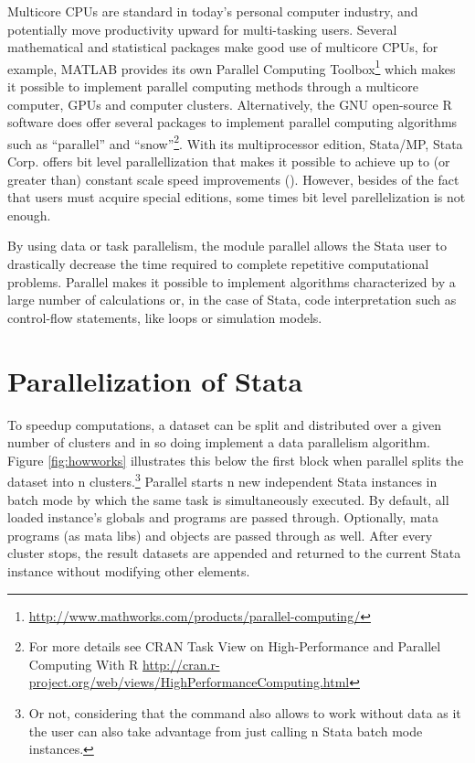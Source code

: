 \documentclass[bib]{statapress}
\begin{document}
Multicore CPUs are standard in today’s personal computer industry, and potentially move productivity upward for multi-tasking users. Several mathematical and statistical packages make good use of multicore CPUs, for example, MATLAB provides its own Parallel Computing Toolbox\footnote{\url{http://www.mathworks.com/products/parallel-computing/}} which makes it possible to implement parallel computing methods through a multicore computer, GPUs and computer clusters. Alternatively, the GNU open-source R software does offer several packages to implement parallel computing algorithms such as ``parallel'' and ``snow''\footnote{For more details see CRAN Task View on High-Performance and Parallel Computing With R \url{http://cran.r-project.org/web/views/HighPerformanceComputing.html}}. 
With its multiprocessor edition, Stata/MP, Stata Corp. offers bit level parallellization that makes it possible to achieve up to (or greater than) constant scale speed improvements (\citet{stata2010}). However, besides of the fact that users must acquire special editions, some times bit level parellelization is not enough.

By using data or task parallelism, the module parallel allows the Stata user to drastically decrease the time required to complete repetitive computational problems. Parallel makes it possible to implement algorithms characterized by a large number of calculations or, in the case of Stata, code interpretation such as control-flow statements, like loops or simulation models.

\section{Parallelization of Stata}

To speedup computations, a dataset can be split and distributed over a given number of clusters and in so doing implement a data parallelism algorithm. Figure \ref{fig:howworks} illustrates this below the first block when parallel splits the dataset into n clusters.\footnote{Or not, considering that the command also allows to work without data as it the user can also take advantage from just calling n Stata batch mode instances.} Parallel starts n new independent Stata instances in batch mode by which the same task is simultaneously executed. By default, all loaded instance’s globals and programs are passed through. Optionally, mata programs (as mata libs) and objects are passed through as well. After every cluster stops, the result datasets are appended and returned to the current Stata instance without modifying other elements.
\end{document}
